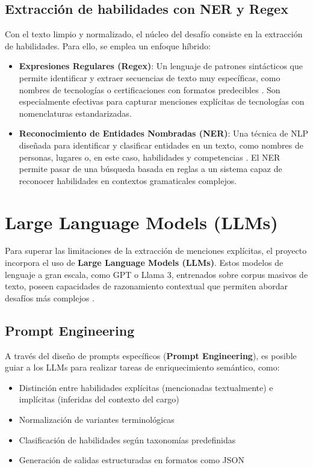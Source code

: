 \subsection{Extracción de habilidades con NER y Regex}

Con el texto limpio y normalizado, el núcleo del desafío consiste en la extracción de habilidades. Para ello, se emplea un enfoque híbrido:

\begin{itemize}
    \item \textbf{Expresiones Regulares (Regex)}: Un lenguaje de patrones sintácticos que permite identificar y extraer secuencias de texto muy específicas, como nombres de tecnologías o certificaciones con formatos predecibles \parencite{lukauskas2023}. Son especialmente efectivas para capturar menciones explícitas de tecnologías con nomenclaturas estandarizadas.

    \item \textbf{Reconocimiento de Entidades Nombradas (NER)}: Una técnica de NLP diseñada para identificar y clasificar entidades en un texto, como nombres de personas, lugares o, en este caso, habilidades y competencias \parencite{herandi2024}. El NER permite pasar de una búsqueda basada en reglas a un sistema capaz de reconocer habilidades en contextos gramaticales complejos.
\end{itemize}

\section{Large Language Models (LLMs)}

Para superar las limitaciones de la extracción de menciones explícitas, el proyecto incorpora el uso de \textbf{Large Language Models (LLMs)}. Estos modelos de lenguaje a gran escala, como GPT o Llama 3, entrenados sobre corpus masivos de texto, poseen capacidades de razonamiento contextual que permiten abordar desafíos más complejos \parencite{herandi2024}.

\subsection{Prompt Engineering}

A través del diseño de prompts específicos (\textbf{Prompt Engineering}), es posible guiar a los LLMs para realizar tareas de enriquecimiento semántico, como:

\begin{itemize}
    \item Distinción entre habilidades explícitas (mencionadas textualmente) e implícitas (inferidas del contexto del cargo) \parencite{nguyen2024}
    \item Normalización de variantes terminológicas
    \item Clasificación de habilidades según taxonomías predefinidas
    \item Generación de salidas estructuradas en formatos como JSON
\end{itemize}

